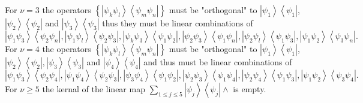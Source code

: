 \documentclass[aps,preprint]{revtex4}%
\begin{document}
For $\nu=3$ the operators $\left\{  \left\vert \psi_{k}\psi_{l}\right\rangle
\left\langle \psi_{m}\psi_{n}\right\vert \right\}  $ must be "orthogonal" to
$\left\vert \psi_{1}\right\rangle \left\langle \psi_{1}\right\vert $,
$\left\vert \psi_{2}\right\rangle \left\langle \psi_{2}\right\vert $ and
$\left\vert \psi_{3}\right\rangle \left\langle \psi_{3}\right\vert $ thus they
must be linear combinations of
\begin{equation}
\left\vert \psi_{1}\psi_{3}\right\rangle \left\langle \psi_{2}\psi
_{n}\right\vert ,\left\vert \psi_{1}\psi_{l}\right\rangle \left\langle
\psi_{2}\psi_{3}\right\vert ,\left\vert \psi_{k}\psi_{3}\right\rangle
\left\langle \psi_{1}\psi_{2}\right\vert ,\left\vert \psi_{2}\psi
_{3}\right\rangle \left\langle \psi_{1}\psi_{n}\right\vert ,\left\vert
\psi_{2}\psi_{l}\right\rangle \left\langle \psi_{1}\psi_{3}\right\vert
,\left\vert \psi_{1}\psi_{2}\right\rangle \left\langle \psi_{3}\psi
_{n}\right\vert .
\end{equation}
For $\nu=4$ the operators $\left\{  \left\vert \psi_{k}\psi_{l}\right\rangle
\left\langle \psi_{m}\psi_{n}\right\vert \right\}  $ must be "orthogonal" to
$\left\vert \psi_{1}\right\rangle \left\langle \psi_{1}\right\vert $,
$\left\vert \psi_{2}\right\rangle \left\langle \psi_{2}\right\vert ,\left\vert
\psi_{3}\right\rangle \left\langle \psi_{3}\right\vert $ and $\left\vert
\psi_{4}\right\rangle \left\langle \psi_{4}\right\vert $ and thus must be
linear combinations of
\begin{equation}
\left\vert \psi_{1}\psi_{3}\right\rangle \left\langle \psi_{2}\psi
_{4}\right\vert ,\left\vert \psi_{1}\psi_{4}\right\rangle \left\langle
\psi_{2}\psi_{3}\right\vert ,\left\vert \psi_{3}\psi_{4}\right\rangle
\left\langle \psi_{1}\psi_{2}\right\vert ,\left\vert \psi_{2}\psi
_{3}\right\rangle \left\langle \psi_{1}\psi_{4}\right\vert ,\left\vert
\psi_{2}\psi_{4}\right\rangle \left\langle \psi_{1}\psi_{3}\right\vert
,\left\vert \psi_{1}\psi_{2}\right\rangle \left\langle \psi_{3}\psi
_{4}\right\vert .
\end{equation}
For $\nu\geq5$ the kernal of the linear map $\sum_{1\leq j\leq5}\left\vert
\psi_{j}\right\rangle \left\langle \psi_{j}\right\vert \wedge$ is empty.
\end{document}
